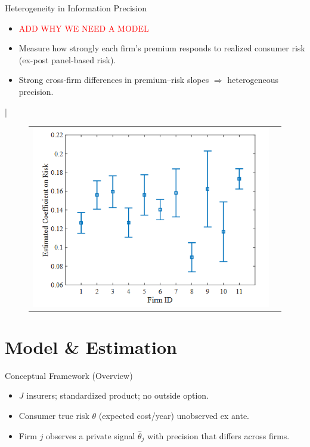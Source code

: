 \documentclass[10pt,aspectratio=169]{beamer}
\begin{document}
\begin{frame}{Heterogeneity in Information Precision}
\justifying
\begin{itemize}
  \item \textcolor{red}{ADD WHY WE NEED A MODEL}
  \item Measure how strongly each firm’s premium responds to realized consumer risk (ex-post panel-based risk).
  \item Strong cross-firm differences in premium–risk slopes $\Rightarrow$ heterogeneous precision.
\end{itemize}|
\vspace{0.75em}
\begin{figure}[H]
\centering{}%
\begin{tabular}{cc}
\includegraphics[scale=0.45]{Figures/Fig2.png}
\end{tabular}
\end{figure}
\end{frame}

\section{Model \& Estimation}

\begin{frame}{Conceptual Framework (Overview)}
\justifying
\begin{itemize}
  \item $J$ insurers; standardized product; no outside option.
  \item Consumer true risk $\theta$ (expected cost/year) unobserved ex ante.
  \item Firm $j$ observes a private signal $\hat{\theta}_j$ with precision that differs across firms.
\end{itemize}
\end{frame}
\end{document}
